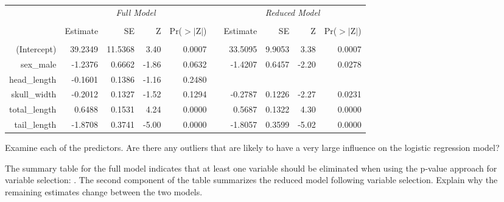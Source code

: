 {\begin{center}\footnotesize
\begin{tabular}{r rrrr r rrrr}
                            & \multicolumn{4}{c}{\emph{Full Model}} &
                            & \multicolumn{4}{c}{\emph{Reduced Model}}  \\
  \cline{2-5}\cline{7-10}
\vspace{-3.1mm} \\
                            & Estimate & SE & Z & Pr($>$$|$Z$|$) &
                            & Estimate & SE & Z & Pr($>$$|$Z$|$) \\ 
  \hline
\vspace{-3.1mm} \\
(Intercept)                 & 39.2349 & 11.5368 & 3.40  & 0.0007 &
                            & 33.5095 & 9.9053  & 3.38  & 0.0007 \\ 
sex\_\hspace{0.3mm}male     & -1.2376 & 0.6662  & -1.86 & 0.0632 &
                            & -1.4207 & 0.6457  & -2.20 & 0.0278 \\ 
head\_\hspace{0.3mm}length  & -0.1601 & 0.1386  & -1.16 & 0.2480 \\ 
skull\_\hspace{0.3mm}width  & -0.2012 & 0.1327  & -1.52 & 0.1294 &
                            & -0.2787 & 0.1226  & -2.27 & 0.0231 \\ 
total\_\hspace{0.3mm}length & 0.6488  & 0.1531  & 4.24  & 0.0000 &
                            & 0.5687  & 0.1322  & 4.30  & 0.0000 \\ 
tail\_\hspace{0.3mm}length  & -1.8708 & 0.3741  & -5.00 & 0.0000 &
                            & -1.8057 & 0.3599  & -5.02 & 0.0000 \\ 
  \hline
\end{tabular}
\end{center}

\begin{parts}
\item Examine each of the predictors. Are there any outliers that are likely 
to have a very large influence on the logistic regression model?
\item The summary table for the full model indicates that at least one 
variable should be eliminated when using the p-value approach for variable 
selection: . The second component of the table 
summarizes the reduced model following variable selection. Explain why the 
remaining estimates change between the two models.
\end{parts}
}{}

